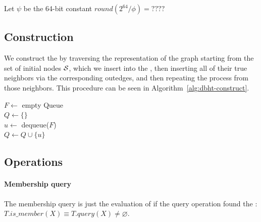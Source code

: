 \begin{algorithm}
  \caption{$\mathit{fingerprint(X)}$}\label{alg:fingerprint}
  Let $\psi$ be the 64-bit constant $\mathit{round}({2^{64}}/{\phi})=????$\\
 
\end{algorithm}

\subsection{\dBHT Construction}
\label{subsubsec:dbht-construction}

We construct the \dBHT by traversing the \dBCM representation of the graph starting from the set of initial nodes $\strsetname{S}$, which we insert into the \dBHT, then inserting all of their true neighbors via the corresponding outedges, and then repeating the process from those neighbors. This procedure can be seen in Algorithm~\ref{alg:dbht-construct}.

\begin{algorithm}
	\caption{$T.\mathit{construct}(C)$}\label{alg:dbht-construct}
  $F \gets$ empty Queue\\
  $Q \gets \{\}$\\
   {
    $u \gets$ dequeue($F$)\\
    $Q \gets Q \cup \{u\}$\\
  }
\end{algorithm}

\subsection{\dBHT Operations}

\paragraph*{Membership query} The membership query is just the evaluation of if the query operation found the \kmer: $T.\mathit{is\_member}(X) \equiv T.\mathit{query}(X) \neq \varnothing$.


